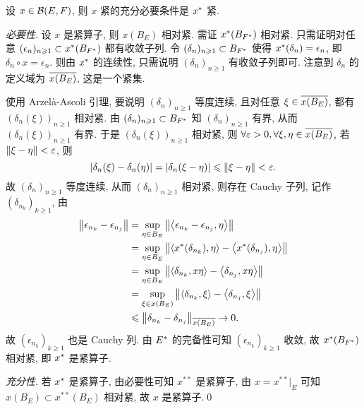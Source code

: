 	\begin{Theorem}
		设 $ x\in\CB(E, F) $, 则 $ x $ 紧的充分必要条件是 $ \Star{x} $ 紧.
	\end{Theorem}
	\begin{Proof}
		\textsl{必要性}. 设 $ x $ 是紧算子, 则 $ x(B_{E}) $ 相对紧. 需证 $ \Star{x}(B_{\Star{F}}) $ 相对紧. 只需证明对任意 $ (\epsilon_{n})_{n\geqslant1}\subset \Star{x}(B_{\Star{F}}) $ 都有收敛子列. 令 $ (\delta_{n})_{n\geqslant1}\subset B_{\Star{F}} $ 使得 $ \Star{x}(\delta_{n})=\epsilon_{n} $, 即 $ \delta_{n}\circ x=\epsilon_{n} $. 则由 $ \Star{x} $ 的连续性, 只需说明 $ (\delta_{n})_{n\geqslant1} $ 有收敛子列即可. 注意到 $ \delta_{n} $ 的定义域为 $ \baro{x(B_{E})} $, 这是一个紧集.

		使用 Arzel\`a-Ascoli 引理, 要说明 $ (\delta_{n})_{n\geqslant1} $ 等度连续, 且对任意 $ \xi\in\baro{x(B_{E})} $, 都有 $ (\delta_{n}(\xi))_{n\geqslant1} $ 相对紧. 由 $ (\delta_{n})_{n\geqslant1}\subset B_{\Star{F}} $ 知 $ (\delta_{n})_{n\geqslant1} $ 有界, 从而 $ (\delta_{n}(\xi))_{n\geqslant1} $ 有界. 于是 $ (\delta_{n}(\xi))_{n\geqslant1} $ 相对紧, 则 $ \forall\varepsilon>0, \forall \xi, \eta\in\baro{x(B_{E})} $, 若 $ \norm{\xi-\eta}<\varepsilon $, 则
		\[
			\abs{\delta_{n}(\xi)-\delta_{n}(\eta)} = \abs{\delta_{n}(\xi-\eta)}\leqslant\norm{\xi-\eta}<\varepsilon.
		\] 
		故 $ (\delta_{n})_{n\geqslant1} $ 等度连续, 从而 $ (\delta_{n})_{n\geqslant1} $ 相对紧, 则存在 Cauchy 子列,
		记作 $ (\delta_{n_{k}})_{k\geqslant1} $, 由
		\[
			\begin{aligned}
				\norm{\epsilon_{n_{k}}-\epsilon_{n_{j}}} & = \sup_{\eta\in B_{E}}\norm{\lrangle{\epsilon_{n_{k}}-\epsilon_{n_{j}}, \eta}} \\
				& = \sup_{\eta\in B_{E}}\norm{\lrangle{\Star{x}(\delta_{n_{k}}), \eta}-\lrangle{\Star{x}(\delta_{n_{j}}), \eta}}\\
				& = \sup_{\eta\in B_{E}}\norm{\lrangle{\delta_{n_{k}}, x\eta}-\lrangle{\delta_{n_{j}}, x\eta}}\\
				& =  \sup_{\xi\in x(B_{E})}\norm{\lrangle{\delta_{n_{k}}, \xi}-\lrangle{\delta_{n_{j}}, \xi}}\\
				& \leqslant \norm{\delta_{n_{k}}-\delta_{n_{j}}}_{\baro{x(B_{E})}}\to 0.
			\end{aligned}
		\]
		故 $ (\epsilon_{n_{k}})_{k\geqslant1} $ 也是 Cauchy 列. 由 $ \Star{E} $ 的完备性可知 $ (\epsilon_{n_{k}})_{k\geqslant1} $ 收敛, 故 $ \Star{x}(B_{\Star{F}}) $ 相对紧, 即 $ \Star{x} $ 是紧算子.

		\textsl{充分性}. 若 $ \Star{x} $ 是紧算子, 由必要性可知 $ x^{**} $ 是紧算子, 由 $ x = x^{**}|_{E} $ 可知 $ x(B_{E})\subset x^{**}(B_{E}) $ 相对紧, 故 $ x $ 是紧算子.\qed
	\end{Proof}

